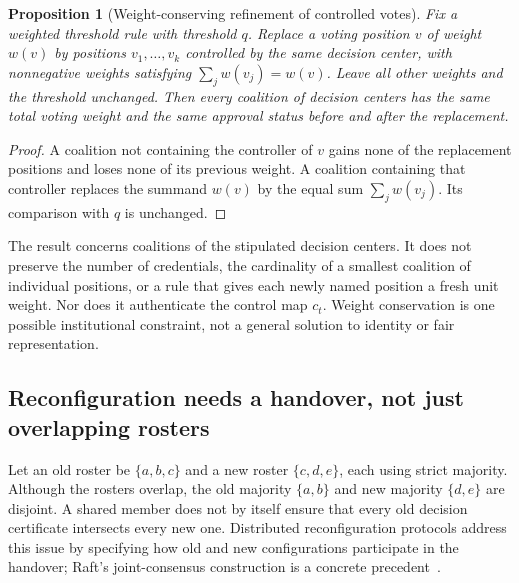 \documentclass[11pt,letterpaper]{article}
\theoremstyle{plain}
\newtheorem{proposition}{Proposition}[section]
\theoremstyle{definition}
\theoremstyle{remark}
\begin{document}
\begin{proposition}[Weight-conserving refinement of controlled votes]\label{prop:forkweight}
Fix a weighted threshold rule with threshold $q$. Replace a voting position $v$ of weight $w(v)$ by positions $v_1,\ldots,v_k$ controlled by the same decision center, with nonnegative weights satisfying $\sum_j w(v_j)=w(v)$. Leave all other weights and the threshold unchanged. Then every coalition of decision centers has the same total voting weight and the same approval status before and after the replacement.
\end{proposition}
\begin{proof}
A coalition not containing the controller of $v$ gains none of the replacement positions and loses none of its previous weight. A coalition containing that controller replaces the summand $w(v)$ by the equal sum $\sum_jw(v_j)$. Its comparison with $q$ is unchanged.
\end{proof}

The result concerns coalitions of the stipulated decision centers. It does not preserve the number of credentials, the cardinality of a smallest coalition of individual positions, or a rule that gives each newly named position a fresh unit weight. Nor does it authenticate the control map $c_t$. Weight conservation is one possible institutional constraint, not a general solution to identity or fair representation.

\subsection{Reconfiguration needs a handover, not just overlapping rosters}
Let an old roster be $\{a,b,c\}$ and a new roster $\{c,d,e\}$, each using strict majority. Although the rosters overlap, the old majority $\{a,b\}$ and new majority $\{d,e\}$ are disjoint. A shared member does not by itself ensure that every old decision certificate intersects every new one. Distributed reconfiguration protocols address this issue by specifying how old and new configurations participate in the handover; Raft's joint-consensus construction is a concrete precedent~\cite{ongaro}.
\end{document}
